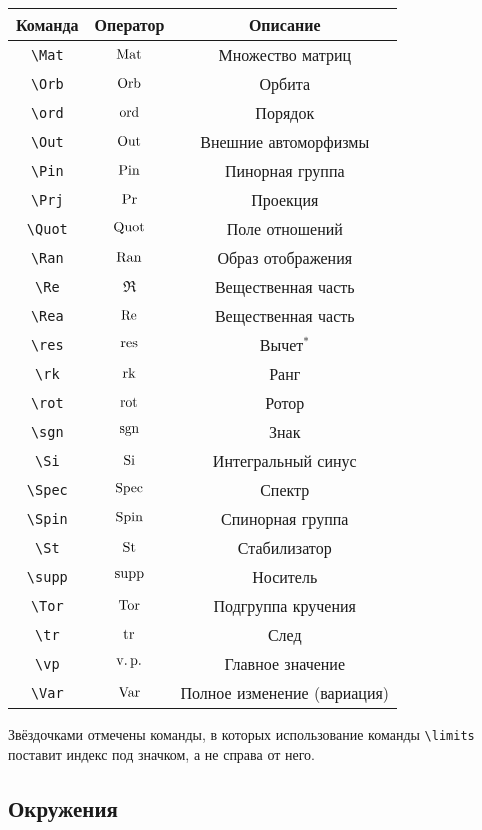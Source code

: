 \documentclass[a4paper]{article}
\begin{document}
\begin{center}
\begin{tabular}{|c|c|c|}
\hline \textbf{Команда} & \textbf{Оператор} & \textbf{Описание} \\
\hline \verb'\Mat' & $\operatorname{Mat}$ &  Множество матриц \\
\hline \verb'\Orb' & $\operatorname{Orb}$ &  Орбита \\
\hline \verb'\ord' & $\operatorname{ord}$ &  Порядок \\
\hline \verb'\Out' & $\operatorname{Out}$ &  Внешние автоморфизмы   \\
\hline \verb'\Pin' & $\operatorname{Pin}$ &  Пинорная группа   \\
\hline \verb'\Prj' & $\operatorname{Pr}$ &  Проекция   \\
\hline \verb'\Quot' & $\operatorname{Quot}$ &  Поле отношений  \\
\hline \verb'\Ran' & $\operatorname{Ran}$ &   Образ отображения \\
\hline \verb'\Re' & $\Re$ &   Вещественная часть \\
\hline \verb'\Rea' & $\operatorname{Re}$ &   Вещественная часть \\
\hline \verb'\res' & $\operatorname*{res}$ &   Вычет$^*$ \\
\hline \verb'\rk' & $\operatorname{rk}$ &   Ранг \\
\hline \verb'\rot' & $\operatorname{rot}$ & Ротор \\
\hline \verb'\sgn' & $\operatorname{sgn}$ & Знак \\
\hline \verb'\Si' & $\operatorname{Si}$ &  Интегральный синус \\
\hline \verb'\Spec' & $\operatorname{Spec}$ &  Спектр \\
\hline \verb'\Spin' & $\operatorname{Spin}$ &  Спинорная группа \\
\hline \verb'\St' & $\operatorname{St}$ &  Стабилизатор \\
\hline \verb'\supp' & $\operatorname{supp}$ &  Носитель \\
\hline \verb'\Tor' & $\operatorname{Tor}$ & Подгруппа кручения \\
\hline \verb'\tr' & $\operatorname{tr}$ &  След \\
\hline \verb'\vp' & $\operatorname{v.p.}$ &  Главное значение \\
\hline \verb'\Var' & $\operatorname{Var}$ &  Полное изменение (вариация)  \\
\hline
\end{tabular}
\end{center}

Звёздочками отмечены команды, в которых использование команды \verb'\limits'
поставит индекс под значком, а не справа от него.

\subsection{Окружения}
\end{document}
